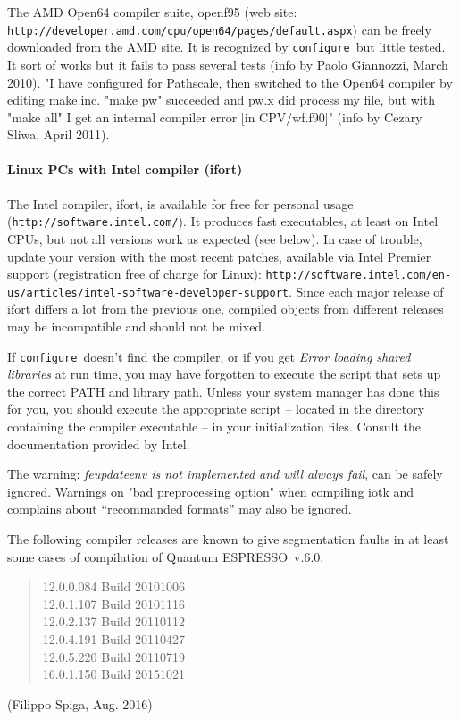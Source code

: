 \documentclass[12pt,a4paper]{article}
\def\qe{{\sc Quantum ESPRESSO}}
\def\configure{\texttt{configure}}
\begin{document}
The AMD Open64 compiler suite, openf95 (web site:
\texttt{http://developer.amd.com/cpu/open64/pages/default.aspx})
can be freely downloaded from the AMD site.
It is recognized by \configure\ but little tested. It sort of works
but it fails to pass several tests (info by Paolo Giannozzi, March 2010).
"I have configured for Pathscale, then switched to the Open64 compiler by
editing make.inc. "make pw" succeeded and pw.x did process my file, but with
"make all" I get an internal compiler error [in CPV/wf.f90]" (info by Cezary
Sliwa, April 2011).

\paragraph{Linux PCs with Intel compiler (ifort)}

The Intel compiler, ifort, is available for free for personal
usage (\texttt{http://software.intel.com/}). It produces fast executables,
at least on Intel CPUs, but not all versions work as expected (see below).
In case of trouble, update your version with the most recent patches,
available via Intel Premier support (registration free of charge for Linux):
\texttt{http://software.intel.com/en-us/articles/intel-software-developer-support}.
Since each major release of ifort
differs a lot from the previous one, compiled objects from different
releases may be incompatible and should not be mixed.

If \configure\ doesn't find the compiler, or if you get
{\em Error loading shared libraries} at run time, you may have
forgotten to execute the script that
sets up the correct PATH and library path. Unless your system manager has
done this for you, you should execute the appropriate script -- located in
the directory containing the compiler executable -- in your
initialization files. Consult the documentation provided by Intel.

The warning: {\em feupdateenv is not implemented and will always fail},
can be safely ignored. Warnings on "bad preprocessing option" when compiling
iotk and complains about ``recommanded formats'' may also be ignored.

The following compiler releases are known to give segmentation faults
in at least some cases of compilation of \qe\ v.6.0:
\begin{quote}
12.0.0.084 Build 20101006\\
12.0.1.107 Build 20101116\\
12.0.2.137 Build 20110112\\
12.0.4.191 Build 20110427\\
12.0.5.220 Build 20110719\\
16.0.1.150 Build 20151021
\end{quote}
(Filippo Spiga, Aug. 2016)
\end{document}
